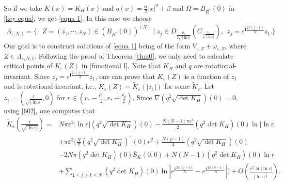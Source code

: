 \documentclass[12pt,reqno]{amsart}
\numberwithin{equation}{section}
\theoremstyle{definition}
\theoremstyle{remark}
\begin{document}
So if we take  $ K(x)=K_H(x) $  and $ q(x)=\frac{\alpha}{2}|x|^2+\beta $ and $ \Omega=B_{R^*}(0) $ in \eqref{key equa}, we get \eqref{equa 1}. 
In this case we choose 
\begin{equation*} 
\begin{split}
\Lambda_{\varepsilon, N,1}=\bigg\{&Z=(z_1,\cdots, z_N)\in\left(  B_{R^*}(0)\right) ^{(N)}\mid z_j\in D_{\frac{\rho_0}{2\sqrt{|\ln\varepsilon|}}}\left (C_{\frac{r_*}{\sqrt{|\ln\varepsilon|}}}\right ),\ \  z_j=e^{\textbf{i}\frac{2\pi(j-1)}{N}}z_1.\bigg\}
\end{split}
\end{equation*}
Our goal is to construct solutions of \eqref{equa 1} being of the form $ V_{\varepsilon,Z}+\omega_{\varepsilon,Z} $, where $ Z\in \Lambda_{\varepsilon, N,1} $.
Following the proof of Theorem \ref{thm0}, we only need to calculate critical points of $ K_\varepsilon(Z) $ in \eqref{functional I}. Note that $  K_H$ and  $ q $ are rotational-invariant. Since $ z_j=e^{\textbf{i}\frac{2\pi(j-1)}{N}}z_1 $, one can prove that $ K_\varepsilon(Z) $ is a   function of $ z_1 $ %
and is rotational-invariant, i.e., $ K_\varepsilon(Z)=\tilde{K}_\varepsilon(|z_1|) $ for some $ \tilde{K}_\varepsilon $. Let $ z_1=\left( \frac{r}{\sqrt{|\ln\varepsilon|}},0\right)  $ for $ r\in \left( r_*-\frac{\rho_0}{2},r_*+\frac{\rho_0}{2} \right)  $. %
Since   $ \nabla \left (q^2\sqrt{\det K_H}\right )(0)=0$, using \eqref{602}, one computes that
\begin{equation} \label{701}
\begin{split}
\tilde{K}_\varepsilon\left (\frac{r}{\sqrt{|\ln\varepsilon|}}\right )
=&N\pi\varepsilon^2|\ln\varepsilon|\left( q^2\sqrt{\det K_H}\right)(0)-\frac{N(N-1)\pi\varepsilon^2}{2}\left( q^2\det K_H\right)(0)\ln|\ln\varepsilon|\\
&+\pi\varepsilon^2\bigg(  \frac{N}{2} \left(q^2\sqrt{\det K_H} \right)^{''}(0 )r^2+ \frac{N(p-1)}{4}   \left( q^2\sqrt{\det K_H}\right) (0)      \\
&-2N\pi   \left( q^2  \det K_H\right)(0) \bar{S}_K(0,0)+N(N-1)\left( q^2  \det K_H\right)(0)\ln r\\
&+\sum_{1\leq j\neq k\leq N}\left( q^2  \det K_H\right)(0)\ln| e^{\textbf{i}\frac{2\pi(j-1)}{N}} - e^{\textbf{i}\frac{2\pi(k-1)}{N}} |\bigg)  
+O\left( \frac{\varepsilon^2\ln|\ln\varepsilon|}{|\ln\varepsilon|^{\frac{1}{2}}}\right).
\end{split}
\end{equation}
\end{document}
